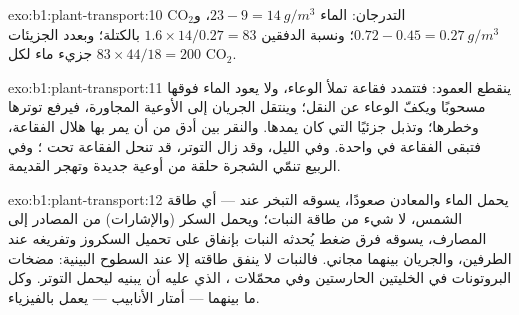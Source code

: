 \begin{solution}{exo:b1:plant-transport:10}
التدرجان: الماء $23 - 9 = \qty{14}{g/m^3}$، و$\mathrm{CO_2}$ $0.72 -
0.45 = \qty{0.27}{g/m^3}$؛ ونسبة الدفقين $1.6\times 14/0.27 = 83$
بالكتلة؛ وبعدد الجزيئات $83\times 44/18 = 200$ جزيء ماء لكل
$\mathrm{CO_2}$.
\end{solution}

\begin{solution}{exo:b1:plant-transport:11}
ينقطع العمود: فتتمدد فقاعة تملأ الوعاء، ولا يعود الماء فوقها
مسحوبًا ويكفّ الوعاء عن النقل؛ وينتقل الجريان إلى الأوعية
المجاورة، فيرفع توترها وخطرها؛ وتذبل جزئيًا  التي كان يمدها.
والنقر بين  أدق من أن يمر بها هلال الفقاعة، فتبقى الفقاعة في
 واحدة. وفي الليل، وقد زال التوتر، قد تنحل الفقاعة تحت ؛ وفي الربيع تنمّي الشجرة حلقة من أوعية جديدة وتهجر القديمة.
\end{solution}

\begin{solution}{exo:b1:plant-transport:12}
يحمل  الماء والمعادن صعودًا، يسوقه التبخر عند  --- أي
طاقة الشمس، لا شيء من طاقة النبات؛ ويحمل  السكر (والإشارات)
من المصادر إلى المصارف، يسوقه فرق ضغط يُحدثه النبات بإنفاق  على
تحميل السكروز وتفريغه عند الطرفين، والجريان بينهما مجاني. فالنبات
لا ينفق طاقته إلا عند السطوح البينية: مضخات البروتونات في الخليتين
الحارستين وفي محمّلات ،  الذي عليه أن يبنيه ليحمل
التوتر. وكل ما بينهما --- أمتار الأنابيب --- يعمل بالفيزياء.
\end{solution}

